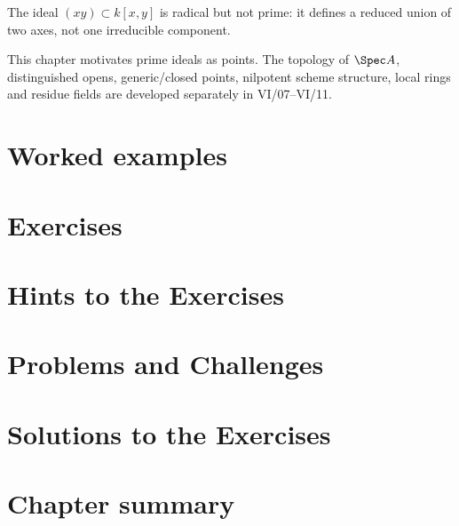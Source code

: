 \begin{warning}
The ideal \((xy)\subset k[x,y]\) is radical but not prime: it defines a reduced union of
two axes, not one irreducible component.
\end{warning}

\begin{warning}
This chapter motivates prime ideals as points.  The topology of \(\Spec A\), distinguished
opens, generic/closed points, nilpotent scheme structure, local rings and residue fields are
developed separately in VI/07--VI/11.
\end{warning}

\section{Worked examples}


\section{Exercises}


\ifdefined\IncludeExerciseHints
\section{Hints to the Exercises}

\fi

\section{Problems and Challenges}



\ifdefined\IncludeExerciseSolutions
\section{Solutions to the Exercises}

\fi

\section{Chapter summary}

